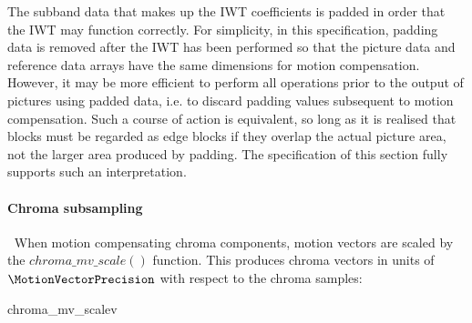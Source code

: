 \begin{informative}
The subband data that makes up the IWT coefficients is padded in order that the IWT
may function correctly. For simplicity, in this specification, padding data is removed
after the IWT has been performed so that the picture data and reference data arrays have
the same dimensions for motion compensation. However, it may be more efficient to perform
all operations prior to the output of pictures using padded data, i.e. to discard padding values
subsequent to motion compensation. Such a course of action is equivalent, so long as it is realised
that blocks must be regarded as edge blocks if they overlap the actual picture area, not the
larger area produced by padding. The specification of this section fully supports such an 
interpretation.
\end{informative}

\paragraph{Chroma subsampling}
\label{chromamvscale}
$\ $\newline
When motion compensating chroma components, motion vectors are scaled by the
$chroma\_mv\_scale()$ function. This produces chroma vectors in units of 
$\MotionVectorPrecision$ with respect to the chroma samples:

\begin{pseudo}{chroma\_mv\_scale}{v}
\end{pseudo}

\begin{comment}

Throughout this Section, the following conventions are used.

\begin{itemize}
\item $x,y$ are co-ordinates in the predicted picture component
\item $u,v$ are co-ordinates in a potentially upconverted reference picture component
\end{itemize}

[Are they??]
\end{comment}

